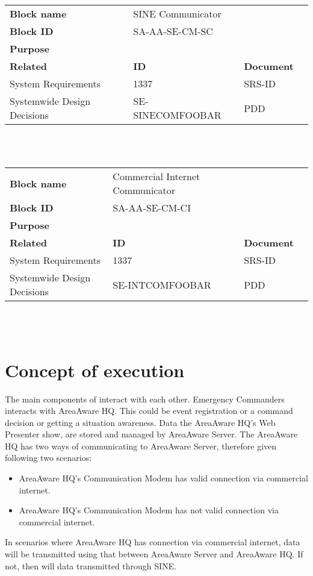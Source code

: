 \begin{tabular}{l|*{3}{l}}
    \textbf{Block name}     & SINE Communicator\\
    \textbf{Block ID}       & SA-AA-SE-CM-SC  & \\
    \textbf{Purpose}        &  \\
    \hline
    \textbf{Related}    & \textbf{ID} & \textbf{Document} \\
    System Requirements & 1337 & SRS-ID \\
    Systemwide Design Decisions & SE-SINECOMFOOBAR & PDD \\
\end{tabular}\\\\

\begin{tabular}{l|*{3}{l}}
    \textbf{Block name}     & Commercial Internet Communicator\\
    \textbf{Block ID}       & SA-AA-SE-CM-CI  & \\
    \textbf{Purpose}        &  \\
    \hline
    \textbf{Related}    & \textbf{ID} & \textbf{Document} \\
    System Requirements & 1337 & SRS-ID \\
    Systemwide Design Decisions & SE-INTCOMFOOBAR & PDD \\
\end{tabular}\\\\






\section{Concept of execution}
\label{sec:concept_execution}

The main components of interact with each other.
Emergency Commanders interacts with AreaAware HQ.
This could be event registration or a command decision or getting a situation awareness.
Data the AreaAware HQ's Web Presenter show, are stored and managed by AreaAware Server.
The AreaAware HQ has two ways of communicating to AreaAware Server, therefore given following two scenarios:
\begin{itemize}
\item AreaAware HQ's Communication Modem has valid connection via commercial internet.
\item AreaAware HQ's Communication Modem has not valid connection via commercial internet.
\end{itemize}
In scenarios where AreaAware HQ has connection via commercial internet, data will be transmitted using that between AreaAware Server and AreaAware HQ.
If not, then will data transmitted through SINE.

